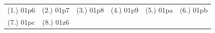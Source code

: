 \begin{eocexercises}{}
\begin{enumerate}
\end{enumerate}

\par \practiceinfo
\par \begin{tabular}[h]{cccccc}
(1.)	01p6	&
(2.)	01p7	&
(3.)	01p8	&
(4.)	01p9	&
(5.)	01pa	&
(6.)	01pb	\\ %
(7.)	01pc	&

(8.) 01z6 &
\end{tabular}

\end{eocexercises}









